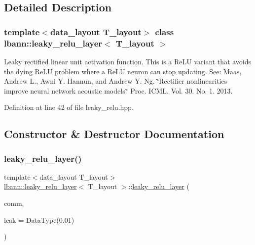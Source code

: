 \subsection{Detailed Description}
\subsubsection*{template$<$data\+\_\+layout T\+\_\+layout$>$\newline
class lbann\+::leaky\+\_\+relu\+\_\+layer$<$ T\+\_\+layout $>$}

Leaky rectified linear unit activation function. This is a Re\+LU variant that avoids the dying Re\+LU problem where a Re\+LU neuron can stop updating. See\+: Maas, Andrew L., Awni Y. Hannun, and Andrew Y. Ng. \char`\"{}\+Rectifier
nonlinearities improve neural network acoustic models.\char`\"{} Proc. I\+C\+ML. Vol. 30. No. 1. 2013. 

Definition at line 42 of file leaky\+\_\+relu.\+hpp.



\subsection{Constructor \& Destructor Documentation}
\mbox{\label{classlbann_1_1leaky__relu__layer_ae401114a3517c40aabde7fbb9d990a1c}} 
\subsubsection{\texorpdfstring{leaky\+\_\+relu\+\_\+layer()}{leaky\_relu\_layer()}}
{\footnotesize\ttfamily template$<$data\+\_\+layout T\+\_\+layout$>$ \\
\hyperlink{classlbann_1_1leaky__relu__layer}{lbann\+::leaky\+\_\+relu\+\_\+layer}$<$ T\+\_\+layout $>$\+::\hyperlink{classlbann_1_1leaky__relu__layer}{leaky\+\_\+relu\+\_\+layer} (\begin{DoxyParamCaption}\item[{\hyperlink{classlbann_1_1lbann__comm}{lbann\+\_\+comm} $\ast$}]{comm,  }\item[{Data\+Type}]{leak = {\ttfamily DataType(0.01)} }\end{DoxyParamCaption})\hspace{0.3cm}{\ttfamily [inline]}}

